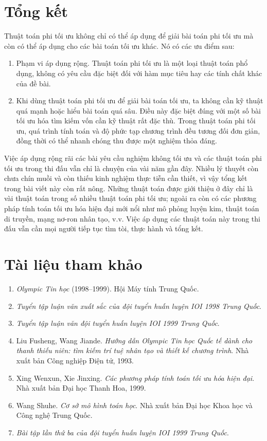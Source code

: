 \documentclass[11pt]{article}
\begin{document}
\section{Tổng kết}

Thuật toán phi tối ưu không chỉ có thể áp dụng để giải bài toán phi tối ưu mà
còn có thể áp dụng cho các bài toán tối ưu khác. Nó có các ưu điểm sau:
\begin{enumerate}
  \item Phạm vi áp dụng rộng. Thuật toán phi tối ưu là một loại thuật toán phổ
  dụng, không có yêu cầu đặc biệt đối với hàm mục tiêu hay các tính chất khác
  của đề bài.
  \item Khi dùng thuật toán phi tối ưu để giải bài toán tối ưu, ta không cần
  kỹ thuật quá mạnh hoặc hiểu bài toán quá sâu. Điều này đặc biệt đúng với
  một số bài tối ưu hóa tìm kiếm vốn cần kỹ thuật rất đặc thù. Trong thuật
  toán phi tối ưu, quá trình tính toán và độ phức tạp chương trình đều tương
  đối đơn giản, đồng thời có thể nhanh chóng thu được một nghiệm thỏa đáng.
\end{enumerate}

Việc áp dụng rộng rãi các bài yêu cầu nghiệm không tối ưu và các thuật toán
phi tối ưu trong thi đấu vẫn chỉ là chuyện của vài năm gần đây. Nhiều lý
thuyết còn chưa chín muồi và còn thiếu kinh nghiệm thực tiễn cần thiết, vì
vậy tổng kết trong bài viết này còn rất nông. Những thuật toán được giới
thiệu ở đây chỉ là vài thuật toán trong số nhiều thuật toán phi tối ưu; ngoài
ra còn có các phương pháp tính toán tối ưu hóa hiện đại mới nổi như mô phỏng
luyện kim, thuật toán di truyền, mạng nơ-ron nhân tạo, v.v. Việc áp dụng các
thuật toán này trong thi đấu vẫn cần mọi người tiếp tục tìm tòi, thực hành và
tổng kết.

\section*{Tài liệu tham khảo}

\begin{enumerate}
  \item \textit{Olympic Tin học} (1998--1999). Hội Máy tính Trung Quốc.
  \item \textit{Tuyển tập luận văn xuất sắc của đội tuyển huấn luyện IOI 1998
  Trung Quốc}.
  \item \textit{Tuyển tập luận văn đội tuyển huấn luyện IOI 1999 Trung Quốc}.
  \item Liu Fusheng, Wang Jiande. \textit{Hướng dẫn Olympic Tin học Quốc tế
  dành cho thanh thiếu niên: tìm kiếm trí tuệ nhân tạo và thiết kế chương
  trình}. Nhà xuất bản Công nghiệp Điện tử, 1993.
  \item Xing Wenxun, Xie Jinxing. \textit{Các phương pháp tính toán tối ưu hóa
  hiện đại}. Nhà xuất bản Đại học Thanh Hoa, 1999.
  \item Wang Shuhe. \textit{Cơ sở mô hình toán học}. Nhà xuất bản Đại học Khoa
  học và Công nghệ Trung Quốc.
  \item \textit{Bài tập lần thứ ba của đội tuyển huấn luyện IOI 1999 Trung
  Quốc}.
\end{enumerate}
\end{document}
